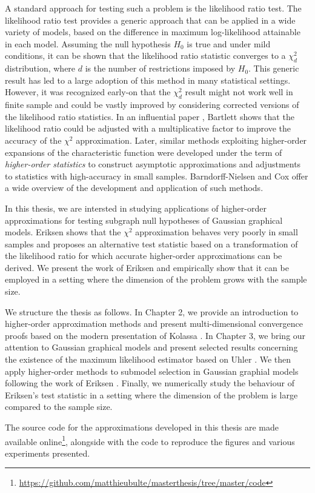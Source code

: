 A standard approach for testing such a problem is the likelihood ratio test. The likelihood ratio test provides a generic approach that can be applied in a wide variety of models, based on the difference in maximum log-likelihood attainable in each model. Assuming the null hypothesis $H_0$ is true and under mild conditions, it can be shown that the likelihood ratio statistic converges to a $\chi^2_d$ distribution, where $d$ is the number of restrictions imposed by $H_0$. This generic result has led to a large adoption of this method in many statistical settings. However, it was recognized early-on that the $\chi^2_d$ result might not work well in finite sample and could be vastly improved by considering corrected versions of the likelihood ratio statistics. In an influential paper \cite{bartlett1937properties}, Bartlett shows that the likelihood ratio could be adjusted with a multiplicative factor to improve the accuracy of the $\chi^2$ approximation. Later, similar methods exploiting higher-order expansions of the characteristic function were developed under the term of \textit{higher-order statistics} to construct asymptotic approximations and adjustments to statistics with high-accuracy in small samples. Barndorff-Nielsen and Cox \cite{barndorff1989asymptotic, cox1994inference} offer a wide overview of the development and application of such methods.

In this thesis, we are intersted in studying applications of higher-order approximations for testing subgraph null hypotheses of Gaussian graphical models. Eriksen \cite{eriksen1996tests} shows that the $\chi^2$ approximation behaves very poorly in small samples and proposes an alternative test statistic based on a transformation of the likelihood ratio for which accurate higher-order approximations can be derived. We present the work of Eriksen and empirically show that it can be employed in a setting where the dimension of the problem grows with the sample size.

We structure the thesis as follows. In Chapter 2, we provide an introduction to higher-order approximation methods and present multi-dimensional convergence proofs based on the modern presentation of Kolassa \cite{kolassa2006series}. In Chapter 3, we bring our attention to Gaussian graphical models and present selected results concerning the existence of the maximum likelihood estimator based on Uhler \cite[Chapter 9]{maathuis2018handbook}. We then apply higher-order methods to submodel selection in Gaussian graphial models following the work of Eriksen \cite{eriksen1996tests}. Finally, we numerically study the behaviour of Eriksen's test statistic in a setting where the dimension of the problem is large compared to the sample size.

The source code for the approximations developed in this thesis are made available online\footnote{\url{https://github.com/matthieubulte/masterthesis/tree/master/code}}, alongside with the code to reproduce the figures and various experiments presented.